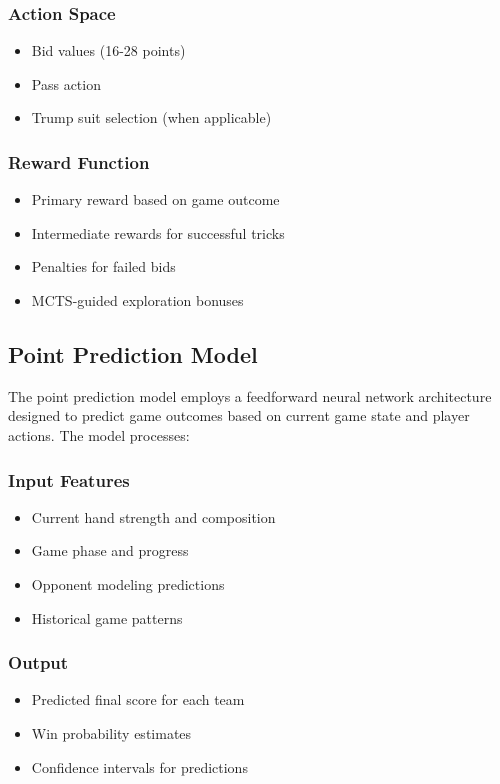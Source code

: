 \documentclass[conference]{IEEEtran}
\begin{document}
\subsubsection{Action Space}
\begin{itemize}
    \item Bid values (16-28 points)
    \item Pass action
    \item Trump suit selection (when applicable)
\end{itemize}

\subsubsection{Reward Function}
\begin{itemize}
    \item Primary reward based on game outcome
    \item Intermediate rewards for successful tricks
    \item Penalties for failed bids
    \item MCTS-guided exploration bonuses
\end{itemize}

\subsection{Point Prediction Model}

The point prediction model employs a feedforward neural network architecture designed to predict game outcomes based on current game state and player actions. The model processes:

\subsubsection{Input Features}
\begin{itemize}
    \item Current hand strength and composition
    \item Game phase and progress
    \item Opponent modeling predictions
    \item Historical game patterns
\end{itemize}

\subsubsection{Output}
\begin{itemize}
    \item Predicted final score for each team
    \item Win probability estimates
    \item Confidence intervals for predictions
\end{itemize}
\end{document}
